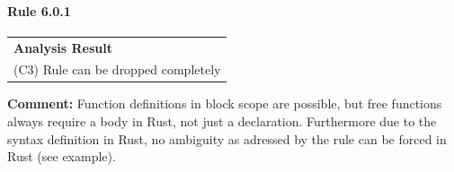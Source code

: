 \paragraph{Rule 6.0.1}
\begin{longtable}{p{13cm}}
\textbf{Analysis Result} \\
(C3) Rule can be dropped completely \\
\end{longtable}
\textbf{Comment:} Function definitions in block scope are possible, but free functions always require a body in Rust, not just a declaration. Furthermore due to the syntax definition in Rust, no ambiguity as adressed by the rule can be forced in Rust (see example). \\



